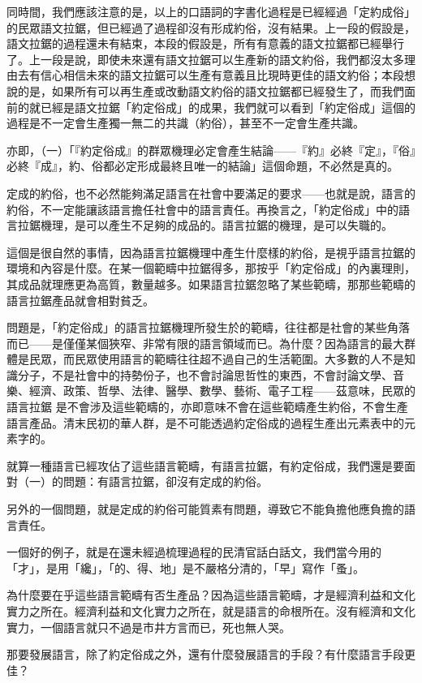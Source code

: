 \documentclass[a5paper, 12pt, openany]{book} %
\begin{document}
同時間，我們應該注意的是，以上的口語詞的字書化過程是已經經過「定約成俗」的民眾語文拉鋸，但已經過了過程卻沒有形成約俗，沒有結果。上一段的假設是，語文拉鋸的過程還未有結束，本段的假設是，所有有意義的語文拉鋸都已經舉行了。上一段是說，即使未來還有語文拉鋸可以生產新的語文約俗，我們都沒太多理由去有信心相信未來的語文拉鋸可以生產有意義且比現時更佳的語文約俗；本段想說的是，如果所有可以再生產或改動語文約俗的語文拉鋸都已經發生了，而我們面前的就已經是語文拉鋸「約定俗成」的成果，我們就可以看到「約定俗成」這個的過程是不一定會生產獨一無二的共識（約俗），甚至不一定會生產共識。

亦即，（一）「『約定俗成』的群眾機理必定會產生結論——『約』必終『定』，『俗』必終『成』，約、俗都必定形成最終且唯一的結論」這個命題，不必然是真的。

定成的約俗，也不必然能夠滿足語言在社會中要滿足的要求——也就是說，語言的約俗，不一定能讓該語言擔任社會中的語言責任。再換言之，「約定俗成」中的語言拉鋸機理，是可以產生不足夠的成品的。語言拉鋸的機理，是可以失職的。

這個是很自然的事情，因為語言拉鋸機理中產生什麼樣的約俗，是視乎語言拉鋸的環境和內容是什麼。在某一個範疇中拉鋸得多，那按乎「約定俗成」的內裏理則，其成品就理應更為高質，數量越多。如果語言拉鋸忽略了某些範疇，那那些範疇的語言拉鋸產品就會相對貧乏。

問題是，「約定俗成」的語言拉鋸機理所發生於的範疇，往往都是社會的某些角落而已——是僅僅某個狹窄、非常有限的語言領域而已。為什麼？因為語言的最大群體是民眾，而民眾使用語言的範疇往往超不過自己的生活範圍。大多數的人不是知識分子，不是社會中的持勢份子，也不會討論思哲性的東西，不會討論文學、音樂、經濟、政策、哲學、法律、醫學、數學、藝術、電子工程——茲意味，民眾的語言拉鋸
是不會涉及這些範疇的，亦即意味不會在這些範疇產生約俗，不會生產語言產品。清末民初的華人群，是不可能透過約定俗成的過程生產出元素表中的元素字的。

就算一種語言已經攻佔了這些語言範疇，有語言拉鋸，有約定俗成，我們還是要面對（一）的問題：有語言拉鋸，卻沒有定成的約俗。

另外的一個問題，就是定成的約俗可能質素有問題，導致它不能負擔他應負擔的語言責任。

一個好的例子，就是在還未經過梳理過程的民清官話白話文，我們當今用的「才」，是用「纔」，「的、得、地」是不嚴格分清的，「早」寫作「蚤」。

為什麼要在乎這些語言範疇有否生產品？因為這些語言範疇，才是經濟利益和文化實力之所在。經濟利益和文化實力之所在，就是語言的命根所在。沒有經濟和文化實力，一個語言就只不過是市井方言而已，死也無人哭。

那要發展語言，除了約定俗成之外，還有什麼發展語言的手段？有什麼語言手段更佳？
\end{document}
